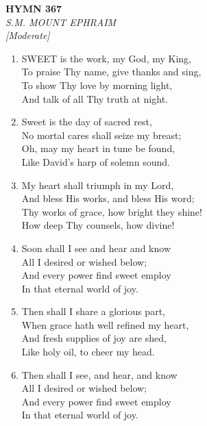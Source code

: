\newpage
\begin{center}
    {\Large \textbf{HYMN 367}}
    \\
    \textit{S.M. MOUNT EPHRAIM}
    \\
    \textit{\small [Moderate]}
\end{center}
\vspace{1em}

\begin{enumerate}
    \item SWEET is the work, my God, my King, \\
        To praise Thy name, give thanks and sing, \\
        To show Thy love by morning light, \\
        And talk of all Thy truth at night.

    \item Sweet is the day of sacred rest, \\
        No mortal cares shall seize my breast; \\
        Oh, may my heart in tune be found, \\
        Like David's harp of solemn sound.

    \item My heart shall triumph in my Lord, \\
        And bless His works, and bless His word; \\
        Thy works of grace, how bright they shine! \\
        How deep Thy counsels, how divine!

    \item Soon shall I see and hear and know \\
        All I desired or wished below; \\
        And every power find sweet employ \\
        In that eternal world of joy.

    \item Then shall I share a glorious part, \\
        When grace hath well refined my heart, \\
        And fresh supplies of joy are shed, \\
        Like holy oil, to cheer my head.

    \item Then shall I see, and hear, and know \\
        All I desired or wished below; \\
        And every power find sweet employ \\
        In that eternal world of joy.

\end{enumerate}

